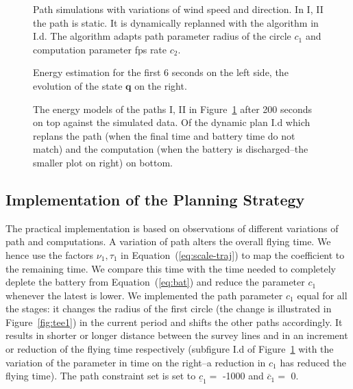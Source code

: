 \documentclass[letterpaper,10pt,conference]{ieeeconf}
\newcommand{\figpath}{./figures}
\theoremstyle{definition}
\begin{document}
\begin{figure}[t]
  \centering
  \footnotesize
  
  \caption[Path of a static and dynamic plan]{Path simulations with variations of wind speed and direction. In I, II the path is static. It is dynamically replanned with the algorithm in I.d. The algorithm adapts path parameter radius of the circle $c_1$ and computation parameter fps rate $c_2$.}
  \label{fig:trajs}
\end{figure}
\begin{figure}[t]
  \centering
  \footnotesize
  
  \caption[Energy estimation and evolution of the state]{Energy estimation for the first 6 seconds on the left side, the evolution of the state $\mathbf{q}$ on the right.}
  \label{fig:model}
\end{figure}
\begin{figure}[t]
  \centering
  \footnotesize
  
  \caption[Energy models of different static and dynamic plans] {The energy models of the paths I, II in Figure~\ref{fig:trajs} after 200 seconds on top against the simulated data. Of the dynamic plan I.d which replans the path (when the final time and battery time do not match) and the computation (when the battery is discharged--the smaller plot on right) on bottom.}
  \label{fig:ener}
\end{figure}

\subsection{Implementation of the Planning Strategy}

The practical implementation is based on observations of different variations of path and computations. A variation of path alters the overall flying time. We hence use the factors $\nu_1,\tau_1$ in Equation~(\ref{eq:scale-traj}) to map the coefficient to the remaining time. We compare this time with the time needed to completely deplete the battery from Equation~(\ref{eq:bat}) and reduce the parameter $c_1$ whenever the latest is lower. We implemented the path parameter $c_1$ equal for all the stages: it changes the radius of the first circle (the change is illustrated in Figure~\ref{fig:tee1}) in the current period and shifts the other paths accordingly. It results in shorter or longer distance between the survey lines and in an increment or reduction of the flying time respectively (subfigure I.d of Figure~\ref{fig:trajs} with the variation of the parameter in time on the right--a reduction in $c_1$ has reduced the flying time). The path constraint set is set to $\underline{c}_1=$ -1000 and $\overline{c}_1=$ 0.
\end{document}
